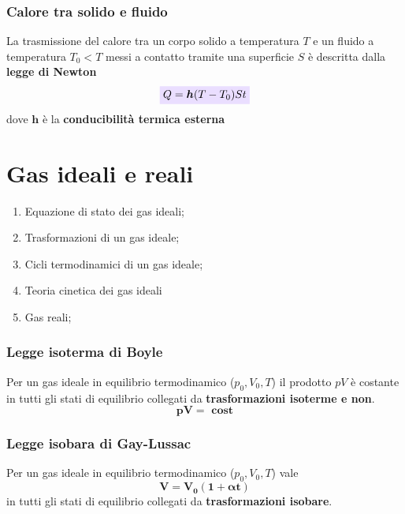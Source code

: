 \documentclass[x11names]{report}
\newcommand{\viola}[1]{\colorbox{yred}{$\displaystyle #1$}}
\begin{document}
	\subsection{Calore tra solido e fluido}
	La trasmissione del calore tra un corpo solido a temperatura \(T\) e un fluido a temperatura \(T_0 < T\) messi a contatto tramite una superficie \(S\) è descritta dalla \textbf{legge di Newton}
	\begin{equation}
		\viola{Q = \boldsymbol{h}(T-T_0)St}
	\end{equation}
	dove \(\boldsymbol{h}\) è la \textbf{conducibilità termica esterna}
	
	\newpage
	\chapter{Gas ideali e reali}
	\begin{es}{}
		\begin{enumerate}
			\item Equazione di stato dei gas ideali;
			\item Trasformazioni di un gas ideale;
			\item Cicli termodinamici di un gas ideale;
			\item Teoria cinetica dei gas ideali
			\item Gas reali;
		\end{enumerate}
	\end{es}
	
	
	\begin{center}
		\colorbox{yred}{\begin{minipage}{5.75in}
				\begin{redes}{}
					\subsection{Legge isoterma di Boyle}
					Per un gas ideale in equilibrio termodinamico (\(p_{0}, V_{0}, T\)) il prodotto \(pV\) è costante  in tutti gli stati di equilibrio collegati da \textbf{trasformazioni isoterme e non}.
					\[ 
					\boldsymbol{pV = \text{ cost}}
					\]
				\end{redes}
		\end{minipage}}
	\end{center}
	
	\begin{center}
		\colorbox{yred}{\begin{minipage}{5.75in}
				\begin{redes}{}
					\subsection{Legge isobara di Gay-Lussac}
					Per un gas ideale in equilibrio termodinamico (\(p_{0}, V_{0}, T\)) vale
					\[ 
					\boldsymbol{V = V_0(1 + \alpha t)}
					\]
					in tutti gli stati di equilibrio collegati da \textbf{trasformazioni isobare}.
				\end{redes}
		\end{minipage}}
	\end{center}
	
\end{document}
